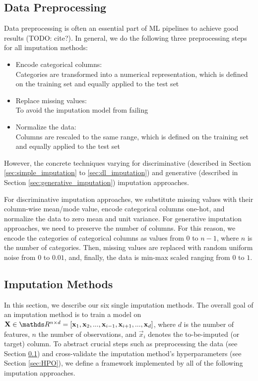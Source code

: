 \subsection{Data Preprocessing}
\label{sec:preprocessing}
%
Data preprocessing is often an essential part of ML pipelines to achieve good results (TODO: cite?). In general, we do the following three preprocessing steps for all imputation methods:
%
\begin{itemize}
	\item Encode categorical columns: \\
		Categories are transformed into a numerical representation, which is defined on the training set and equally applied to the test set

	\item Replace missing values: \\
		To avoid the imputation model from failing

	\item Normalize the data: \\
		Columns are rescaled to the same range, which is defined on the training set and equally applied to the test set
\end{itemize}
%
However, the concrete techniques varying for discriminative (described in Section \ref{sec:simple_imputation} to \ref{sec:dl_imputation}) and generative (described in Section \ref{sec:generative_imputation}) imputation approaches.

For discriminative imputation approaches, we substitute missing values with their column-wise mean/mode value, encode categorical columns one-hot, and normalize the data to zero mean and unit variance.
For generative imputation approaches, we need to preserve the number of columns. For this reason, we encode the categories of categorical columns as values from $0$ to $n-1$, where $n$ is the number of categories. Then, missing values are replaced with random uniform noise from $0$ to $0.01$, and, finally, the data is min-max scaled ranging from $0$ to $1$.

\subsection{Imputation Methods}
\label{sec:methods:impuation}
%
In this section, we describe our six single imputation methods. The overall goal of an imputation method is to train a model on $\vec{X}\in\R^{n\times d} = [\vec{x}_1, \vec{x}_2, ..., \vec{x}_{i-1}, \vec{x}_{i+1}, ..., \vec{x}_d]$, where $d$ is the number of features, $n$ the number of observations, and $\vec{x}_i$ denotes the to-be-imputed (or target) column.
To abstract crucial steps such as preprocessing the data (see Section \ref{sec:preprocessing}) and cross-validate the imputation method's hyperparameters (see Section \ref{sec:HPO}), we define a framework implemented by all of the following imputation approaches.


